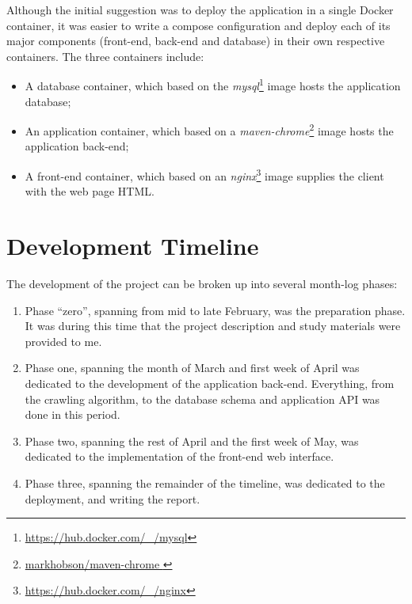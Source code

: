 Although the initial suggestion was to deploy the application in a single Docker container, it was easier to write a compose configuration and deploy each of its major components (front-end, back-end and database) in their own respective containers. The three containers include:
\begin{itemize}
    \item A database container, which based on the \textit{mysql}\footnote{\url{https://hub.docker.com/_/mysql}} image hosts the application database;
    \item An application container, which based on a \textit{maven-chrome}\footnote{\url{markhobson/maven-chrome
    }} image hosts the application back-end;
    \item A front-end container, which based on an \textit{nginx}\footnote{\url{https://hub.docker.com/_/nginx}} image supplies the client with the web page HTML\@.
\end{itemize}

\section{Development Timeline}

The development of the project can be broken up into several month-log phases:
\begin{enumerate}
    \item Phase ``zero'', spanning from mid to late February, was the preparation phase. It was during this time that the project description and study materials were provided to me.
    \item Phase one, spanning the month of March and first week of April was dedicated to the development of the application back-end. Everything, from the crawling algorithm, to the database schema and application API was done in this period.
    \item Phase two, spanning the rest of April and the first week of May, was dedicated to the implementation of the front-end web interface.
    \item Phase three, spanning the remainder of the timeline, was dedicated to the deployment, and writing the report.
\end{enumerate}
